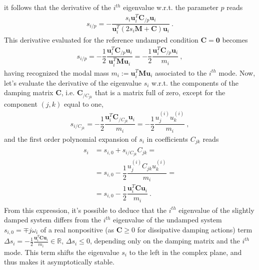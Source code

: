 \documentclass[letterpaper,10pt,english]{jupyterBook}
\begin{document}
\sphinxAtStartPar
it follows that the derivative of the \(i^{th}\) eigenvalue w.r.t. the parameter \(p\) reads
\begin{equation*}
\begin{split}s_{i/p} = - \dfrac{s_i \mathbf{u}_i^T \mathbf{C}_{/p} \mathbf{u}_i}{\mathbf{u}_i^T (2 s_i \mathbf{M} + \mathbf{C} ) \mathbf{u}_i} \ .\end{split}
\end{equation*}
\sphinxAtStartPar
This derivative evaluated for the reference undamped condition \(\mathbf{C} = \mathbf{0}\) becomes
\begin{equation*}
\begin{split}s_{i/p} = - \dfrac{1}{2} \dfrac{\mathbf{u}_i^T \mathbf{C}_{/p} \mathbf{u}_i}{\mathbf{u}_i^T \mathbf{M} \mathbf{u}_i} = - \dfrac{1}{2} \dfrac{\mathbf{u}_i^T \mathbf{C}_{/p} \mathbf{u}_i}{m_i} \ ,\end{split}
\end{equation*}
\sphinxAtStartPar
having recognized the modal mass \(m_i := \mathbf{u}_i^T \mathbf{M} \mathbf{u}_i\) associated to the \(i^{th}\) mode. Now, let’s evaluate the derivative of the eigenvalue \(s_i\) w.r.t. the components of the damping matrix \(\mathbf{C}\), i.e. \(\mathbf{C}_{/C_{jk}}\) that is a matrix full of zero, except for the component \((j,k)\) equal to one,
\begin{equation*}
\begin{split}s_{i/C_{jk}} = - \dfrac{1}{2} \dfrac{\mathbf{u}_i^T \mathbf{C}_{/C_{jk}} \mathbf{u}_i}{m_i} = -\dfrac{1}{2} \dfrac{u^{(i)}_j u^{(i)}_k}{m_i} \ ,\end{split}
\end{equation*}
\sphinxAtStartPar
and the first order polynomial expansion of \(s_i\) in coefficients \(C_{jk}\) reads
\begin{equation}\label{equation:ch/solids/structural-damping:eq:damping:eigenvalues}
\begin{split}\begin{aligned}
  s_i & = s_{i,0} + s_{i/C_{jk}} C_{jk} = \\
      & = s_{i,0} - \dfrac{1}{2} \dfrac{u^{(i)}_j C_{jk} u^{(i)}_k}{m_i} = \\
      & = s_{i,0} - \dfrac{1}{2} \dfrac{\mathbf{u}_i^T \mathbf{C} \mathbf{u}_i}{m_i}
\ .
\end{aligned}\end{split}
\end{equation}
\sphinxAtStartPar
From this expression, it’s possible to deduce that the \(i^{th}\) eigenvalue of the slightly damped system differs from the \(i^{th}\) eigenvalue of the undamped system \(s_{i,0} = \mp j \omega_{i}\) of a real non\sphinxhyphen{}positive (as \(\mathbf{C} \ge 0\) for dissipative damping actions) term \(\Delta s_i = - \frac{1}{2} \frac{\mathbf{u}_i^T \mathbf{C} \mathbf{u}_i}{m_i} \in \mathbb{R}\), \(\Delta s_i \le 0\), depending only on the damping matrix and the \(i^{th}\) mode. This term shifts the eigenvalue \(s_i\) to the left in the complex plane, and thus makes it asymptotically stable.
\end{document}
